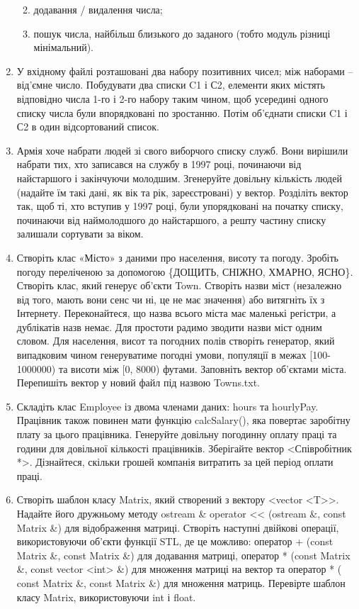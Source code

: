 \documentclass[]{article}
\begin{document}
\begin{enumerate}
  \begin{enumerate}
  \def\labelenumii{\alph{enumii}.}
  \item
    додавання / видалення числа;
  \item
    пошук числа, найбільш близького до заданого (тобто модуль різниці
    мінімальний).
  \end{enumerate}
\item
  У вхідному файлі розташовані два набору позитивних чисел; між наборами
  -- від'ємне число. Побудувати два списки C1 і С2, елементи яких
  містять відповідно числа 1-го і 2-го набору таким чином, щоб усередині
  одного списку числа були впорядковані по зростанню. Потім об'єднати
  списки C1 і С2 в один відсортований список.
\item
  Армія хоче набрати людей зі свого виборчого списку служб. Вони
  вирішили набрати тих, хто записався на службу в 1997 році, починаючи
  від найстаршого і закінчуючи молодшим. Згенеруйте довільну кількість
  людей (надайте їм такі дані, як вік та рік, зареєстровані) у вектор.
  Розділіть вектор так, щоб ті, хто вступив у 1997 році, були
  упорядковані на початку списку, починаючи від наймолодшого до
  найстаршого, а решту частину списку залишали сортувати за віком.
\item
  Створіть клас «Місто» з даними про населення, висоту та погоду.
  Зробіть погоду переліченою за допомогою \{ДОЩИТЬ, СНІЖНО, ХМАРНО,
  ЯСНО\}. Створіть клас, який генерує об'єкти Town. Створіть назви міст
  (незалежно від того, мають вони сенс чи ні, це не має значення) або
  витягніть їх з Інтернету. Переконайтеся, що назва всього міста має
  маленькі регістри, а дублікатів назв немає. Для простоти радимо
  зводити назви міст одним словом. Для населення, висот та погодних
  полів створіть генератор, який випадковим чином генеруватиме погодні
  умови, популяції в межах {[}100-1000000) та висоти між {[}0, 8000)
  футами. Заповніть вектор об'єктами міста. Перепишіть вектор у новий
  файл під назвою Towns.txt.
\item
  Складіть клас Employee із двома членами даних: hours та hourlyPay.
  Працівник також повинен мати функцію calcSalary(), яка повертає
  заробітну плату за цього працівника. Генеруйте довільну погодинну
  оплату праці та години для довільної кількості працівників. Зберігайте
  вектор \textless{}Співробітник *\textgreater{}. Дізнайтеся, скільки
  грошей компанія витратить за цей період оплати праці.
\item
  Створіть шаблон класу Matrix, який створений з вектору
  \textless{}vector \textless{}T\textgreater{}\textgreater{}. Надайте
  його дружньому методу ostream \& operator \textless{}\textless{}
  (ostream \&, const Matrix \&) для відображення матриці. Створіть
  наступні двійкові операції, використовуючи об'єкти функції STL, де це
  можливо: оператор + (const Matrix \&, const Matrix \&) для додавання
  матриці, оператор * (const Matrix \&, const vector
  \textless{}int\textgreater{} \&) для множення матриці на вектор та
  оператор * ( const Matrix \&, const Matrix \&) для множення матриць.
  Перевірте шаблон класу Matrix, використовуючи int і float.
\end{enumerate}
\end{document}
